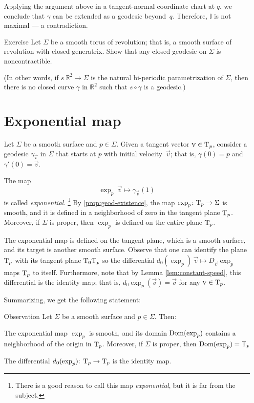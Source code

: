Applying the argument above in a tangent-normal coordinate chart at $q$, we conclude that $\gamma$ can be extended as a geodesic beyond~$q$.
Therefore, $\mathbb{I}$ is not maximal --- a contradiction.
\qeds

\begin{thm}{Exercise}\label{ex:round-torus}
Let $\Sigma$ be a smooth torus of revolution; that is,
a smooth surface of revolution with closed generatrix.
Show that any closed geodesic on $\Sigma$ is noncontractible.

(In other words, if $s\:\mathbb{R}^2\to \Sigma$ is the natural bi-periodic parametrization of $\Sigma$, then
there is no closed curve $\gamma$ in $\mathbb{R}^2$ such that $s\circ\gamma$ is a geodesic.)
\end{thm}


\section{Exponential map}\label{sec:exp}

Let $\Sigma$ be a smooth surface and $p\in \Sigma$.
Given a tangent vector ${\text{\sc{v}}}\in \mathrm{T}_p$, consider a geodesic $\gamma_{\vec v}$ in $\Sigma$ that starts at $p$ with initial velocity~$\vec v$; 
that is, $\gamma(0)=p$ and $\gamma'(0)={\vec v}$.

The map 
\[\exp_p\:\vec v\mapsto \gamma_{\vec v}(1)\]
is called \emph{exponential}.%
\footnote{There is a good reason to call this map {}\emph{exponential}, but it is far from the subject.}
By \ref{prop:geod-existence}, the map $\exp_p\colon\mathrm{T}_p\to \Sigma$ is smooth, and it is defined in a neighborhood of zero in the tangent plane $\mathrm{T}_p$.
Moreover, if $\Sigma$ is proper, then $\exp_p$ is defined on the entire plane $\mathrm{T}_p$.

The exponential map
is defined on the tangent plane, which is a smooth surface,
and its target is another smooth surface.
Observe that one can identify the plane $\mathrm{T}_p$
with its tangent plane $\mathrm{T}_0\mathrm{T}_p$ so the differential $d_0(\exp_p)\:\vec v\mapsto D_{\vec v}\exp_p$ maps $\mathrm{T}_p$ to itself.
Furthermore, note that by Lemma \ref{lem:constant-speed}, this differential is the identity map; that is, $d_0\exp_p(\vec v)=
\vec v$ for any $\text{\sc{v}}\in \mathrm{T}_p$.

Summarizing, we get the following statement:

\begin{thm}{Observation}\label{obs:d(exp)=1}
Let $\Sigma$ be a smooth surface and $p\in \Sigma$.
Then:

\begin{subthm}{}
The exponential map $\exp_p$ is smooth, and its domain $\mathop{\rm Dom}\nolimits(\exp_p)$ contains a neighborhood of the origin in $\mathrm{T}_p$.
Moreover, if $\Sigma$ is proper, then $\mathop{\rm Dom}\nolimits(\exp_p)=\mathrm{T}_p$
\end{subthm}

\begin{subthm}{}
The differential $d_0(\exp_p)\colon\mathrm{T}_p\to \mathrm{T}_p$ is the identity map.
\end{subthm}

\end{thm}

